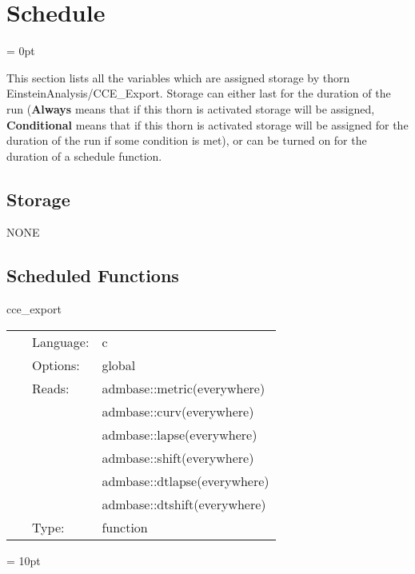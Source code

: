 
\section{Schedule} 


\parskip = 0pt


\noindent This section lists all the variables which are assigned storage by thorn EinsteinAnalysis/CCE\_Export.  Storage can either last for the duration of the run ({\bf Always} means that if this thorn is activated storage will be assigned, {\bf Conditional} means that if this thorn is activated storage will be assigned for the duration of the run if some condition is met), or can be turned on for the duration of a schedule function.


\subsection*{Storage}NONE
\subsection*{Scheduled Functions}
\vspace{5mm}


\hspace{5mm} cce\_export 

\hspace{5mm}{\it export metric data on sphere for cce } 


\hspace{5mm}

 \begin{tabular*}{160mm}{cll} 
~ & Language:  & c \\ 
~ & Options:  & global \\ 
~ & Reads:  & admbase::metric(everywhere) \\ 
~& ~ &admbase::curv(everywhere)\\ 
~& ~ &admbase::lapse(everywhere)\\ 
~& ~ &admbase::shift(everywhere)\\ 
~& ~ &admbase::dtlapse(everywhere)\\ 
~& ~ &admbase::dtshift(everywhere)\\ 
~ & Type:  & function \\ 
\end{tabular*} 



\vspace{5mm}\parskip = 10pt 

